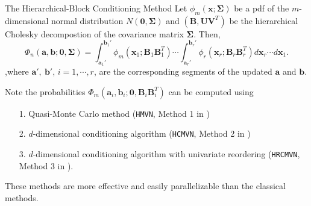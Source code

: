 \begin{frame}{The Hierarchical-Block Conditioning Method}
\footnotesize
Let $\phi_m(\mathbf{x}; \boldsymbol{\Sigma})$ be a pdf of the $m$-dimensional normal distribution $N(\mathbf{0}, \boldsymbol{\Sigma})$ and $(\mathbf{B}, \mathbf{U}\mathbf{V}^T)$ be the hierarchical Cholesky decompostion of the covariance matrix $\boldsymbol{\Sigma}$. Then,
\begin{equation}\label{eqn:hmvn}
\Phi_n(\mathbf{a}, \mathbf{b}; \mathbf{0}, \boldsymbol{\Sigma}) 
= \int_{\mathbf{a}_1'}^{\mathbf{b}_1'} \phi_m(\mathbf{x}_1; \mathbf{B}_1\mathbf{B}_1^T) 
\cdots 
\int_{\mathbf{a}_r'}^{\mathbf{b}_r'} \phi_r(\mathbf{x}_r; \mathbf{B}_r\mathbf{B}_r^T) d\mathbf{x}_r \cdots d\mathbf{x}_1.
\end{equation}
,where $\mathbf{a}',~\mathbf{b}'$, $i=1,\cdots,r$, are the corresponding segments of the updated $\mathbf{a}$ and $\mathbf{b}$. 

Note the probabilities $\Phi_m(\mathbf{a}_i, \mathbf{b}_i; \mathbf{0}, \mathbf{B}_i\mathbf{B}_i^T)$ can be computed using
\begin{itemize}
	\item[1.] Quasi-Monte Carlo method (\texttt{HMVN}, Method 1 in \citet{cao2019hierarchical})
	\item[2.] $d$-dimensional conditioning algorithm (\texttt{HCMVN}, Method 2 in \citet{cao2019hierarchical})
	\item[3.] $d$-dimensional conditioning algorithm with univariate reordering (\texttt{HRCMVN}, Method 3 in \citet{cao2019hierarchical}). 
\end{itemize} 
These methods are more effective and easily parallelizable than the classical methods.
\end{frame}

